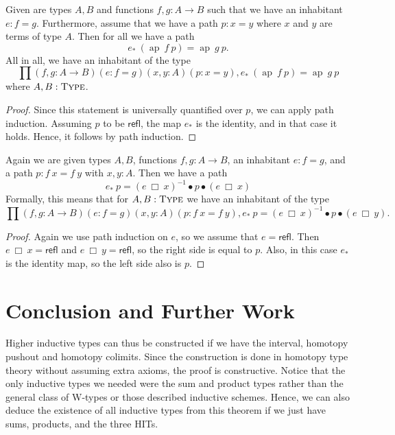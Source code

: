 \documentclass[a4paper,UKenglish]{lipics-v2016}
\newcommand{\Boperator}[1]{\mathsf{#1}}
\newcommand{\fpath}[0]{\> \Box \>}
\newcommand{\conc}[0]{\bullet}
\newcommand{\ap}[0]{\operatorname{ap}}
\newcommand{\refl}[0]{\Boperator{refl}}
\newcommand{\Type}[0]{\operatorname{\textsc{Type}}}
\begin{document}
\begin{lemma}
\label{lem:pathext}
Given are types $A, B$ and functions $f, g : A \rightarrow B$ such that we have an inhabitant $e : f = g$.
Furthermore, assume that we have a path $p : x = y$ where $x$ and $y$ are terms of type $A$.
Then for all we have a path
\[
e_* \> (\ap \> f \> p) = \ap \> g \> p.
\]
All in all, we have an inhabitant of the type
\[
\prod (f, g : A \rightarrow B) (e : f = g) (x, y : A) (p : x = y), e_* \> (\ap \> f \> p) = \ap \> g \> p
\]
where $A, B : \Type$.
\end{lemma}

\begin{proof}
Since this statement is universally quantified over $p$, we can apply path induction.
Assuming $p$ to be $\refl$, the map $e_*$ is the identity, and in that case it holds.
Hence, it follows by path induction.
\end{proof}

\begin{lemma}
\label{lem:funTrans}
Again we are given types $A, B$, functions $f, g : A \rightarrow B$, an inhabitant $e : f = g$, and a path $p : f \> x = f \> y$ with $x, y : A$.
Then we have a path 
\[
e_* \> p = (e \fpath x)^{-1} \conc p \conc (e \fpath x)
\]
Formally, this means that for $A, B : \Type$ we have an inhabitant of the type
\[
\prod (f, g : A \rightarrow B) (e : f = g) (x, y : A) (p : f \> x = f \> y), e_* \> p = (e \fpath x)^{-1} \conc p \conc (e \fpath y).
\]
\end{lemma}

\begin{proof}
Again we use path induction on $e$, so we assume that $e = \refl$.
Then $e \fpath x = \refl$ and $e \fpath y = \refl$, so the right side is equal to $p$.
Also, in this case $e_*$ is the identity map, so the left side also is $p$.
\end{proof}

\section{Conclusion and Further Work}
Higher inductive types can thus be constructed if we have the interval, homotopy pushout and homotopy colimits.
Since the construction is done in homotopy type theory without assuming extra axioms, the proof is constructive.
Notice that the only inductive types we needed were the sum and product types rather than the general class of W-types or those described inductive schemes.
Hence, we can also deduce the existence of all inductive types from this theorem if we just have sums, products, and the three HITs. 
\end{document}
